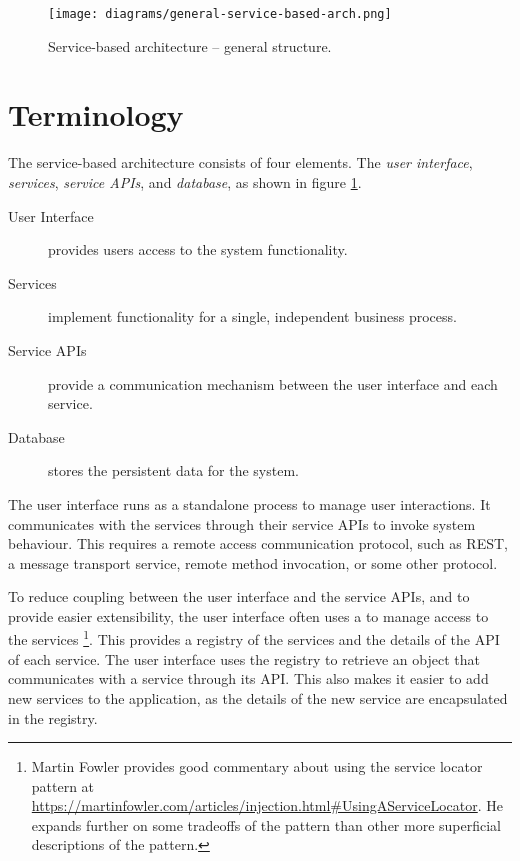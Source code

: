 \begin{figure}[h!]
    \begin{adjustwidth}{-7.5mm}{-7.5mm}
        \centering
        \texttt{[image: diagrams/general-service-based-arch.png]}
    \end{adjustwidth}
    \caption{Service-based architecture -- general structure.}
    \label{fig:service-based-arch}
\end{figure}


\section{Terminology}

The service-based architecture consists of four elements.
The \emph{user interface}, \emph{services}, \emph{service APIs}, and \emph{database}, as shown in figure \ref{fig:service-based-arch}.

\begin{description}
    \item[User Interface] provides users access to the system functionality.
    \item[Services] implement functionality for a single, independent business process.
    \item[Service APIs] provide a communication mechanism between the user interface and each service.
    \item[Database] stores the persistent data for the system.
\end{description}

The user interface runs as a standalone process to manage user interactions.
It communicates with the services through their service APIs to invoke system behaviour.
This requires a remote access communication protocol, such as REST, a message transport service,
remote method invocation,  or some other protocol.

To reduce coupling between the user interface and the service APIs, and to provide easier extensibility, the user interface often uses a
 to manage access to the services%
\footnote{Martin Fowler provides good commentary about using the service locator pattern at \url{https://martinfowler.com/articles/injection.html\#UsingAServiceLocator}.
He expands further on some tradeoffs of the pattern than other more superficial descriptions of the pattern.}.
This provides a registry of the services and the details of the API of each service.
The user interface uses the registry to retrieve an object that communicates with a service through its API.
This also makes it easier to add new services to the application, as the details of the new service are encapsulated in the registry.

